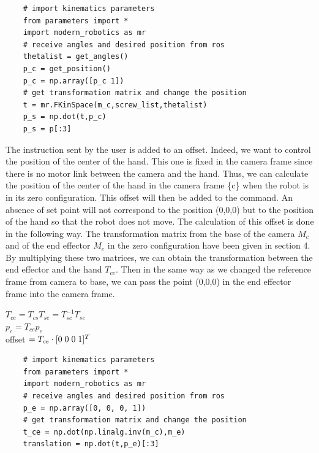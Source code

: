 \bigbreak
\begin{verbatim}
    # import kinematics parameters
    from parameters import * 
    import modern_robotics as mr
    # receive angles and desired position from ros 
    thetalist = get_angles()
    p_c = get_position()
    p_c = np.array([p_c 1])
    # get transformation matrix and change the position
    t = mr.FKinSpace(m_c,screw_list,thetalist)
    p_s = np.dot(t,p_c)
    p_s = p[:3]
\end{verbatim}

\bigbreak
The instruction sent by the user is added to an offset. Indeed, we want to control the position of the center of the hand. This one is fixed in the camera frame since there is no motor link between the camera and the hand. Thus, we can calculate the position of the center of the hand in the camera frame \{c\} when the robot is in its zero configuration. This offset will then be added to the command. An absence of set point will not correspond to the position (0,0,0) but to the position of the hand so that the robot does not move. The calculation of this offset is done in the following way. The transformation matrix from the base of the camera $M_c$ and of the end effector $M_e$ in the zero configuration have been given in section 4. By multiplying these two matrices, we can obtain the transformation between the end effector and the hand $T_{ce}$. Then in the same way as we changed the reference frame from camera to base, we can pass the point (0,0,0) in the end effector frame into the camera frame.

\begin{center}
    $T_{ce} = T_{cs}T_{se} =T_{sc}^{-1}T_{se}$\\
    $p_c = T_{ce}p_e$\\
    offset $= T_{ce}\cdot[0\hspace{0.1cm}0\hspace{0.1cm}0\hspace{0.1cm}1]^T$
\end{center}
\begin{verbatim}
    # import kinematics parameters
    from parameters import * 
    import modern_robotics as mr
    # receive angles and desired position from ros 
    p_e = np.array([0, 0, 0, 1])
    # get transformation matrix and change the position
    t_ce = np.dot(np.linalg.inv(m_c),m_e)
    translation = np.dot(t,p_e)[:3]
\end{verbatim}



